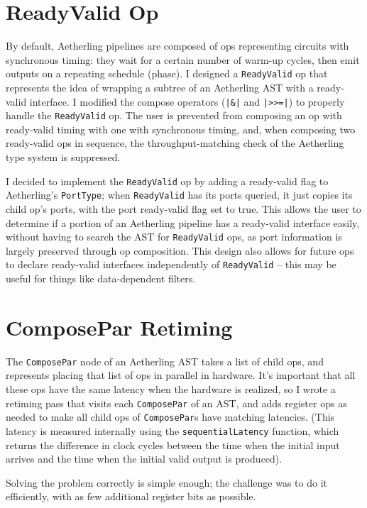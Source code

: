 \documentclass[12pt]{article}
\begin{document}
\section{ReadyValid Op}

By default, Aetherling pipelines are composed of ops representing
circuits with synchronous timing: they wait for a certain number of
warm-up cycles, then emit outputs on a repeating schedule (phase). I
designed a \texttt{ReadyValid} op that represents the idea of wrapping
a subtree of an Aetherling AST with a ready-valid interface.  I
modified the compose operators (\texttt{|\&|} and \texttt{|>>=|}) to
properly handle the \texttt{ReadyValid} op.  The user is prevented
from composing an op with ready-valid timing with one with synchronous
timing, and, when composing two ready-valid ops in sequence, the
throughput-matching check of the Aetherling type system is suppressed.

I decided to implement the \texttt{ReadyValid} op by adding a
ready-valid flag to Aetherling's \texttt{PortType}; when
\texttt{ReadyValid} has its ports queried, it just copies its child
op's ports, with the port ready-valid flag set to true. This allows
the user to determine if a portion of an Aetherling pipeline has a
ready-valid interface easily, without having to search the AST for
\texttt{ReadyValid} ops, as port information is largely preserved
through op composition. This design also allows for future ops to
declare ready-valid interfaces independently of \texttt{ReadyValid} --
this may be useful for things like data-dependent filters.

\section{ComposePar Retiming}

The \texttt{ComposePar} node of an Aetherling AST takes a list of
child ops, and represents placing that list of ops in parallel in
hardware. It's important that all these ops have the same latency when
the hardware is realized, so I wrote a retiming pass that visits each
\texttt{ComposePar} of an AST, and adds register ops as needed to make
all child ops of \texttt{ComposePar}s have matching latencies. (This
latency is measured internally using the \texttt{sequentialLatency}
function, which returns the difference in clock cycles between
the time when the initial input arrives and the time when the
initial valid output is produced).

Solving the problem correctly is simple enough; the challenge was to
do it efficiently, with as few additional register bits as possible.
\end{document}
